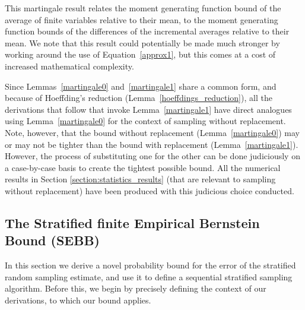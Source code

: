 This martingale result relates the moment generating function bound of the average of finite variables relative to their mean, to the moment generating function bounds of the  differences of the incremental averages relative to their mean. 
We note that this result could potentially be made much stronger by working around the use of Equation~\eqref{approx1}, but this comes at a cost of increased mathematical complexity.

Since Lemmas~\ref{martingale0} and~\ref{martingale1} share a common form, and because of Hoeffding's reduction (Lemma~\ref{hoeffdings_reduction}), 
all the derivations that follow that invoke Lemma~\ref{martingale1} have direct analogues using Lemma~\ref{martingale0} for the context of sampling without replacement.
Note, however, that the bound without replacement (Lemma~\ref{martingale0}) may or may not be tighter than the bound with replacement (Lemma~\ref{martingale1}). However, the process of substituting one for the other can be done judiciously on a case-by-case basis to create the tightest possible bound.
All the numerical results in Section \ref{section:statistics_results} (that are relevant to sampling without replacement) have been produced with this judicious choice conducted.

\subsection{The Stratified finite Empirical Bernstein Bound (SEBB)}
\label{sec:constructing}

In this section we derive a novel probability bound for the error of the stratified random sampling estimate, 
and use it to define a sequential stratified sampling algorithm. 
Before this, we begin by precisely defining the context of our derivations, to which our bound applies.

